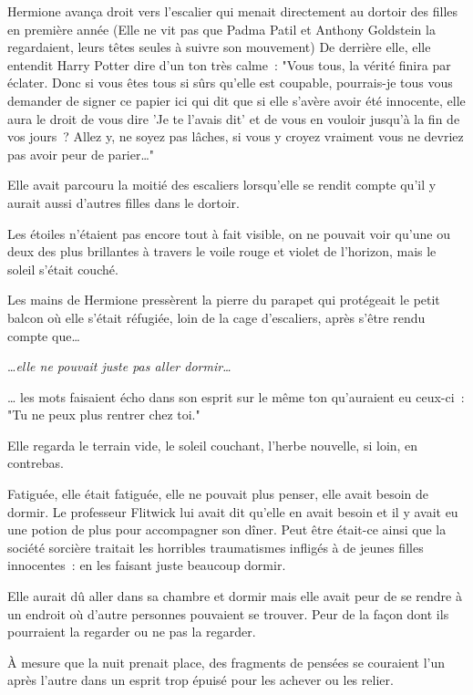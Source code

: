 Hermione avança droit vers l'escalier qui menait directement au dortoir des filles en première année (Elle ne vit pas que Padma Patil et Anthony Goldstein la regardaient, leurs têtes seules à suivre son mouvement) De derrière elle, elle entendit Harry Potter dire d'un ton très calme~: "Vous tous, la vérité finira par éclater. Donc si vous êtes tous si sûrs qu'elle est coupable, pourrais-je tous vous demander de signer ce papier ici qui dit que si elle s'avère avoir été innocente, elle aura le droit de vous dire 'Je te l'avais dit' et de vous en vouloir jusqu'à la fin de vos jours~? Allez y, ne soyez pas lâches, si vous y croyez vraiment vous ne devriez pas avoir peur de parier…"

Elle avait parcouru la moitié des escaliers lorsqu'elle se rendit compte qu'il y aurait aussi d'autres filles dans le dortoir.

\later

Les étoiles n'étaient pas encore tout à fait visible, on ne pouvait voir qu'une ou deux des plus brillantes à travers le voile rouge et violet de l'horizon, mais le soleil s'était couché.

Les mains de Hermione pressèrent la pierre du parapet qui protégeait le petit balcon où elle s'était réfugiée, loin de la cage d'escaliers, après s'être rendu compte que…

…\emph{elle ne pouvait juste pas aller dormir…}

… les mots faisaient écho dans son esprit sur le même ton qu'auraient eu ceux-ci~: "Tu ne peux plus rentrer chez toi."

Elle regarda le terrain vide, le soleil couchant, l'herbe nouvelle, si loin, en contrebas.

Fatiguée, elle était fatiguée, elle ne pouvait plus penser, elle avait besoin de dormir. Le professeur Flitwick lui avait dit qu'elle en avait besoin et il y avait eu une potion de plus pour accompagner son dîner. Peut être était-ce ainsi que la société sorcière traitait les horribles traumatismes infligés à de jeunes filles innocentes~: en les faisant juste beaucoup dormir.

Elle aurait dû aller dans sa chambre et dormir mais elle avait peur de se rendre à un endroit où d'autre personnes pouvaient se trouver. Peur de la façon dont ils pourraient la regarder ou ne pas la regarder.

À mesure que la nuit prenait place, des fragments de pensées se couraient l'un après l'autre dans un esprit trop épuisé pour les achever ou les relier.

